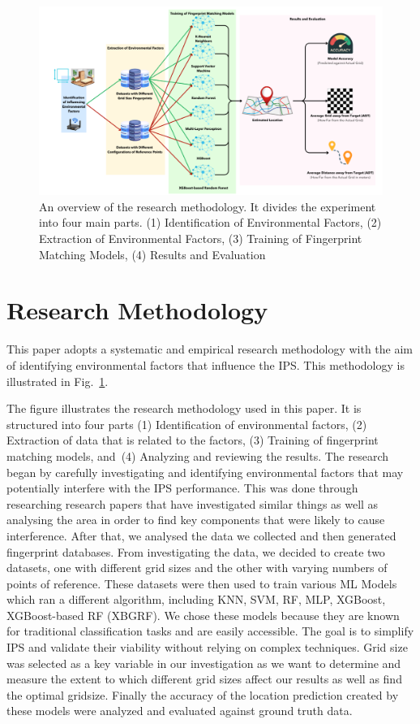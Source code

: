 \documentclass[runningheads]{llncs}
\begin{document}
\begin{figure}
	\includegraphics[width=\textwidth]{meth1.png}
	\caption{An overview of the research methodology. It divides the experiment into four main parts. (1) Identification of Environmental Factors, (2) Extraction of Environmental Factors, (3) Training of Fingerprint Matching Models, (4) Results and Evaluation}
	\label{fig:graph_step}
\end{figure}

\section{Research Methodology}
\vspace{-10pt}
This paper adopts a systematic and empirical research methodology with the aim of identifying environmental factors that influence the IPS. This methodology is illustrated in Fig.~\ref{fig:graph_step}.

The figure illustrates the research methodology used in this paper. It is structured into four parts (1) Identification of environmental factors, (2) Extraction of data that is related to the factors, (3) Training of fingerprint matching models, and~(4) Analyzing and reviewing the results. The research began by carefully investigating and identifying environmental factors that may potentially interfere with the IPS performance. This was done through researching research papers that have investigated similar things as well as analysing the area in order to find key components that were likely to cause interference. After that, we analysed the data we collected and then generated fingerprint databases. From investigating the data, we decided to create two datasets, one with different grid sizes and the other with varying numbers of points of reference. These datasets were then used to train various ML Models which ran a different algorithm, including KNN, SVM, RF, MLP, XGBoost, XGBoost-based RF (XBGRF). We chose these models because they are known for traditional classification tasks and are easily accessible. The goal is to simplify IPS and validate their viability without relying on complex techniques. Grid size was selected as a key variable in our investigation as we want to determine and measure the extent to which different grid sizes affect our results as well as find the optimal gridsize. Finally the accuracy of the location prediction created by these models were analyzed and evaluated against ground truth data.
\end{document}
